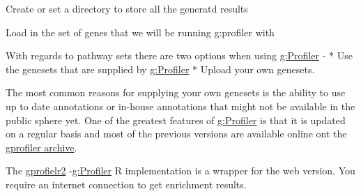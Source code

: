 \documentclass[
]{book}
\newenvironment{Shaded}{\begin{snugshade}}{\end{snugshade}}
\newcommand{\AttributeTok}[1]{\textcolor[rgb]{0.77,0.63,0.00}{#1}}
\newcommand{\CommentTok}[1]{\textcolor[rgb]{0.56,0.35,0.01}{\textit{#1}}}
\newcommand{\ConstantTok}[1]{\textcolor[rgb]{0.00,0.00,0.00}{#1}}
\newcommand{\ControlFlowTok}[1]{\textcolor[rgb]{0.13,0.29,0.53}{\textbf{#1}}}
\newcommand{\FunctionTok}[1]{\textcolor[rgb]{0.00,0.00,0.00}{#1}}
\newcommand{\NormalTok}[1]{#1}
\newcommand{\OtherTok}[1]{\textcolor[rgb]{0.56,0.35,0.01}{#1}}
\newcommand{\SpecialCharTok}[1]{\textcolor[rgb]{0.00,0.00,0.00}{#1}}
\newcommand{\StringTok}[1]{\textcolor[rgb]{0.31,0.60,0.02}{#1}}
\begin{document}
Create or set a directory to store all the generatd results

\begin{Shaded}
\end{Shaded}

Load in the set of genes that we will be running g:profiler with

\begin{Shaded}
\end{Shaded}

With regards to pathway sets there are two options when using \href{https://biit.cs.ut.ee/gprofiler/gost}{g:Profiler} -
* Use the genesets that are supplied by \href{https://biit.cs.ut.ee/gprofiler/gost}{g:Profiler}
* Upload your own genesets.

The most common reasons for supplying your own genesets is the ability to use up to date annotations or in-house annotations that might not be available in the public sphere yet. One of the greatest features of \href{https://biit.cs.ut.ee/gprofiler/gost}{g:Profiler} is that it is updated on a regular basis and most of the previous versions are available online ont the \href{https://biit.cs.ut.ee/gprofiler/page/archives}{gprofiler archive}.

The \href{https://biit.cs.ut.ee/gprofiler/page/r}{gprofielr2} -\href{https://biit.cs.ut.ee/gprofiler/gost}{g:Profiler} R implementation is a wrapper for the web version. You require an internet connection to get enrichment results.
\end{document}
